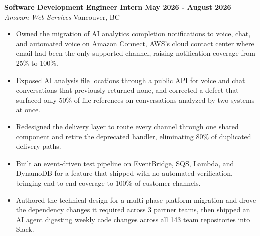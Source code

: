 \documentclass[12pt, letterpaper]{article}
\newenvironment{highlights}{
    \begin{itemize}[
        topsep=0.10 cm,
        parsep=0.10 cm,
        partopsep=0pt,
        itemsep=0pt,
        leftmargin=0.4 cm + 10pt
    ]
}{
    \end{itemize}
} %
\begin{document}
\noindent

\noindent
\textbf{Software Development Engineer Intern} \hfill \textbf{May 2026 - August 2026} \\ %
\textit{Amazon Web Services} \hfill Vancouver, BC%
\begin{highlights}
    \item Owned the migration of AI analytics completion notifications to voice, chat, and automated voice on Amazon Connect, AWS's cloud contact center where email had been the only supported channel, raising notification coverage from 25\% to 100\%.
    \item Exposed AI analysis file locations through a public API for voice and chat conversations that previously returned none, and corrected a defect that surfaced only 50\% of file references on conversations analyzed by two systems at once.
    \item Redesigned the delivery layer to route every channel through one shared component and retire the deprecated handler, eliminating 80\% of duplicated delivery paths.
    \item Built an event-driven test pipeline on EventBridge, SQS, Lambda, and DynamoDB for a feature that shipped with no automated verification, bringing end-to-end coverage to 100\% of customer channels.
    \item Authored the technical design for a multi-phase platform migration and drove the dependency changes it required across 3 partner teams, then shipped an AI agent digesting weekly code changes across all 143 team repositories into Slack.
\end{highlights}
\end{document}

